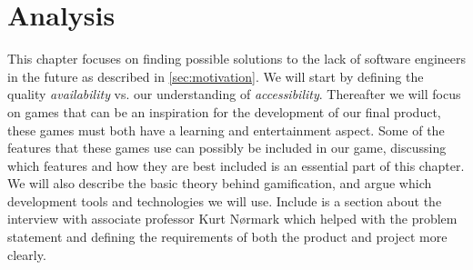 \chapter{Analysis}
\label{cha:analysis}

This chapter focuses on finding possible solutions to the lack of software engineers in the future as described in \autoref{sec:motivation}. We will start by defining the quality \textit{availability} vs. our understanding of \textit{accessibility}. Thereafter we will focus on games that can be an inspiration for the development of our final product, these games must both have a learning and entertainment aspect. Some of the features that these games use can possibly be included in our game, discussing which features and how they are best included is an essential part of this chapter. We will also describe the basic theory behind gamification, and argue which development tools and technologies we will use. Include is a section about the interview with associate professor Kurt N{\o}rmark which helped with the problem statement and defining the requirements of both the product and project more clearly.\newpage

%

%
%









